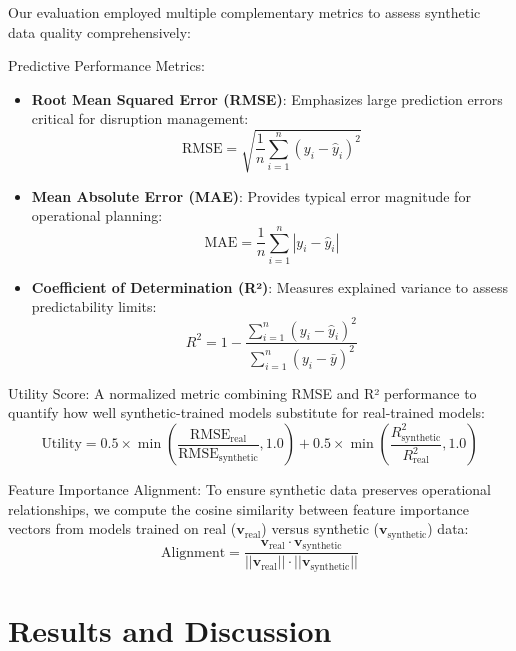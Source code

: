 \documentclass[conference]{IEEEtran}
\begin{document}
Our evaluation employed multiple complementary metrics to assess synthetic data quality comprehensively:

Predictive Performance Metrics:
\begin{itemize}
    \item \textbf{Root Mean Squared Error (RMSE)}: Emphasizes large prediction errors critical for disruption management:
    \begin{equation}
    \text{RMSE} = \sqrt{\frac{1}{n}\sum_{i=1}^{n}(y_i - \hat{y}_i)^2}
    \end{equation}
    
    \item \textbf{Mean Absolute Error (MAE)}: Provides typical error magnitude for operational planning:
    \begin{equation}
    \text{MAE} = \frac{1}{n}\sum_{i=1}^{n}|y_i - \hat{y}_i|
    \end{equation}
    
    \item \textbf{Coefficient of Determination (R²)}: Measures explained variance to assess predictability limits:
    \begin{equation}
    R^2 = 1 - \frac{\sum_{i=1}^{n}(y_i - \hat{y}_i)^2}{\sum_{i=1}^{n}(y_i - \bar{y})^2}
    \end{equation}
\end{itemize}

Utility Score: A normalized metric combining RMSE and R² performance to quantify how well synthetic-trained models substitute for real-trained models:
\begin{equation}
\text{Utility} = 0.5 \times \min\left(\frac{\text{RMSE}_{\text{real}}}{\text{RMSE}_{\text{synthetic}}}, 1.0\right) + 0.5 \times \min\left(\frac{R^2_{\text{synthetic}}}{R^2_{\text{real}}}, 1.0\right)
\end{equation}

Feature Importance Alignment:
To ensure synthetic data preserves operational relationships, we compute the cosine similarity between feature importance vectors from models trained on real ($\mathbf{v}_{\text{real}}$) versus synthetic ($\mathbf{v}_{\text{synthetic}}$) data:
\begin{equation}
\text{Alignment} = \frac{\mathbf{v}_{\text{real}} \cdot \mathbf{v}_{\text{synthetic}}}{||\mathbf{v}_{\text{real}}|| \cdot ||\mathbf{v}_{\text{synthetic}}||}
\end{equation}



\section{Results and Discussion}
\end{document}
